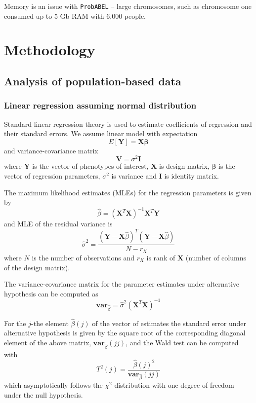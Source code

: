 \documentclass[12pt]{article}
\begin{document}
Memory is an issue with \texttt{ProbABEL} -- large chromosomes, 
such as chromosome one consumed up to 5 Gb RAM with 6,000 people. 

\section{Methodology}

\subsection{Analysis of population-based data}

\subsubsection{Linear regression assuming normal distribution}

Standard linear regression theory is used to estimate coefficients of
regression and their standard errors. We assume linear model with
expectation
\begin{equation}
E[\mathbf{Y}] = \mathbf{X} \mathbf{\beta}
\label{expectation}
\end{equation}
and variance-covariance matrix 
$$
\mathbf{V} = \sigma^2 \mathbf{I}
$$
where $\mathbf{Y}$ is the vector of phenotypes of interest, 
$\mathbf{X}$ is design matrix, $\mathbf{\beta}$ is the vector of regression 
parameters, $\sigma^2$ is variance and $\mathbf{I}$ is identity matrix. 

The maximum likelihood estimates (MLEs) for the regression parameters 
is given by
\begin{equation}
\hat{\beta} = (\mathbf{X}^T \mathbf{X})^{-1} \mathbf{X}^T \mathbf{Y}
\end{equation}
and MLE of the residual variance is
\begin{equation}
\hat{\sigma}^2 = \frac{(\mathbf{Y} - \mathbf{X}\hat{\beta})^T (\mathbf{Y} - \mathbf{X}\hat{\beta})}
			{N-r_X}
\end{equation}
where $N$ is the number of observations and $r_X$ is rank of $\mathbf{X}$ 
(number of columns of the design matrix). 

The variance-covariance matrix for the parameter estimates under 
alternative hypothesis can be 
computed as 
\begin{equation}
\mathbf{var}_{\hat{\beta}} = \hat{\sigma}^2 (\mathbf{X}^T\mathbf{X})^{-1}
\end{equation}

For the $j$-the element $\hat{\beta}(j)$ of the vector of estimates the standard 
error under alternative hypothesis is given by the square root of the 
corresponding diagonal element of the above matrix, $\mathbf{var}_{\hat{\beta}}(jj)$,
and the Wald test can be computed with
$$
T^2(j) = \frac{ \hat{\beta}(j)^2 }{ \mathbf{var}_{\hat{\beta}}(jj) }
$$
which asymptotically follows the $\chi^2$ distribution with one degree of 
freedom under the null hypothesis. 
\end{document}
